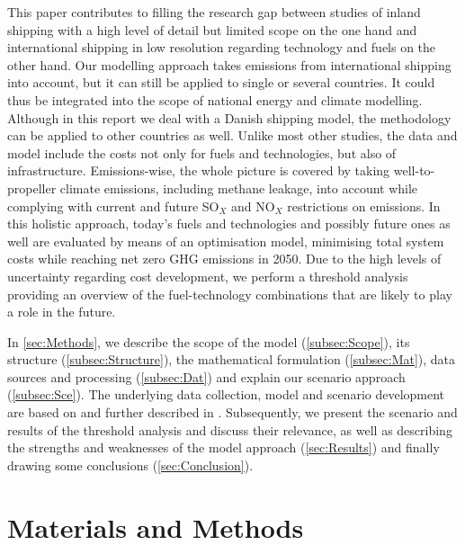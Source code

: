 \documentclass[article]{elsarticle}
\begin{document}
This paper contributes to filling the research gap between studies of inland shipping with a high level of detail but limited scope on the one hand and international shipping in low resolution regarding technology and fuels on the other hand. Our modelling approach takes emissions from international shipping into account, but it can still be applied to single or several countries. It could thus be integrated into the scope of national energy and climate modelling. Although in this report we deal with a Danish shipping model, the methodology can be applied to other countries as well.
Unlike most other studies, the data and model include the costs not only for fuels and technologies, but also of infrastructure. Emissions-wise, the whole picture is covered by taking well-to-propeller climate emissions, including methane leakage, into account while complying with current and future SO$_X$ and NO$_X$ restrictions on emissions.
In this holistic approach, today's fuels and technologies and possibly future ones as well are evaluated by means of an optimisation model, minimising total system costs while reaching net zero GHG emissions in 2050. Due to the  high levels of uncertainty regarding cost development, we perform a threshold analysis providing an overview of the fuel-technology combinations that are likely to play a role in the future.

In \autoref{sec:Methods}, we describe the scope of the model (\autoref{subsec:Scope}), its structure (\autoref{subsec:Structure}), the mathematical formulation (\autoref{subsec:Mat}), data sources and processing (\autoref{subsec:Dat}) and explain our scenario approach (\autoref{subsec:Sce}). The underlying data collection, model and scenario development are based on and further described in \cite{Thesis2018}. Subsequently, we present the scenario and results of the threshold analysis and discuss their relevance, as well as describing the strengths and weaknesses of the model approach (\autoref{sec:Results}) and finally drawing some conclusions (\autoref{sec:Conclusion}).  

\section{Materials and Methods}
\label{sec:Methods}
\end{document}
